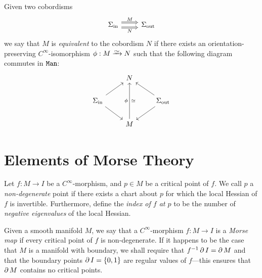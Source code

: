 \begin{definition}
    \label{def:equivalence-of-cobordisms}
    Given two cobordisms
    \[
        \begin{tikzcd}
            \Sigma_{\text{in}} \ar[r, shift right=1.5, Rightarrow, "N"']
            \ar[r, shift left=1.5, Rightarrow, "M"]
            &\Sigma_{\text{out}}
        \end{tikzcd}
    \]
    we say that \(M\) is \emph{equivalent} to the cobordism \(N\) if there exists an
    orientation-preserving \(C^{\infty}\)-isomorphism \(\phi: M \isoto N\) such that
    the following diagram commutes in \({\texttt{Man}}\):
    \[
        \begin{tikzcd}
            &N &
            \\
            \Sigma_{\text{in}} \ar[ru] \ar[rd]
            &
            &\Sigma_{\text{out}} \ar[lu] \ar[ld]
            \\
            &M \ar[uu, "\phi", "\dis"']&
        \end{tikzcd}
    \]
\end{definition}

\section{Elements of Morse Theory}

\begin{definition}
    \label{def:non-degenerate-point-and-index}
    Let \(f: M \to I\) be a \(C^{\infty}\)-morphism, and \(p \in M\) be a critical
    point of \(f\). We call \(p\) a \emph{non-degenerate} point if there exists a
    chart about \(p\) for which the local Hessian of \(f\) is
    invertible. Furthermore, define the \emph{index of \(f\) at \(p\)} to be the
    number of \emph{negative eigenvalues} of the local Hessian.
\end{definition}

\begin{definition}
    \label{def:morse-maps}
    Given a smooth manifold \(M\), we say that a \(C^{\infty}\)-morphism
    \(f: M \to I\) is a \emph{Morse map} if every critical point of \(f\) is
    non-degenerate. If it happens to be the case that \(M\) is a manifold with
    boundary, we shall require that \(f^{-1} \operatorname{\partial} I = \operatorname{\partial} M\) and that the boundary
    points \(\operatorname{\partial} I = \{0, 1\}\) are regular values of \(f\)---this ensures that
    \(\operatorname{\partial} M\) contains no critical points.
\end{definition}

